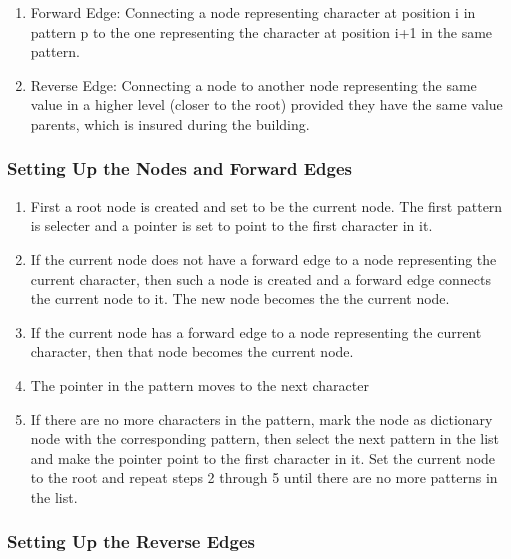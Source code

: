 \documentclass[paper=a4, fontsize=11pt]{scrartcl} %
\numberwithin{equation}{section} %
\numberwithin{figure}{section} %
\numberwithin{table}{section} %
\begin{document}
\begin{enumerate}
\item Forward Edge: Connecting a node representing character at position i in pattern p to the one representing the character at position i+1 in the same pattern.
\item Reverse Edge: Connecting a node to another node representing the same value in a higher level (closer to the root) provided they have the same value parents, which is insured during the building.
\end{enumerate}

\subsubsection{Setting Up the Nodes and Forward Edges}
\begin{enumerate}

\item First a root node is created and set to be the current node. The first pattern is selecter and a pointer is set to point to the first character in it.

\item If the current node does not have a forward edge to a node representing the current character, then such a node is created and a forward edge connects the current node to it. The new node becomes the the current node.

\item If the current node has a forward edge to a node representing the current character, then that node becomes the current node.

\item The pointer in the pattern moves to the next character

\item If there are no more characters in the pattern, mark the node as dictionary node with the corresponding pattern, then select the next pattern in the list and make the pointer point to the first character in it. Set the current node to the root and repeat steps 2 through 5 until there are no more patterns in the list.
\end{enumerate}

\subsubsection{Setting Up the Reverse Edges}
\end{document}
